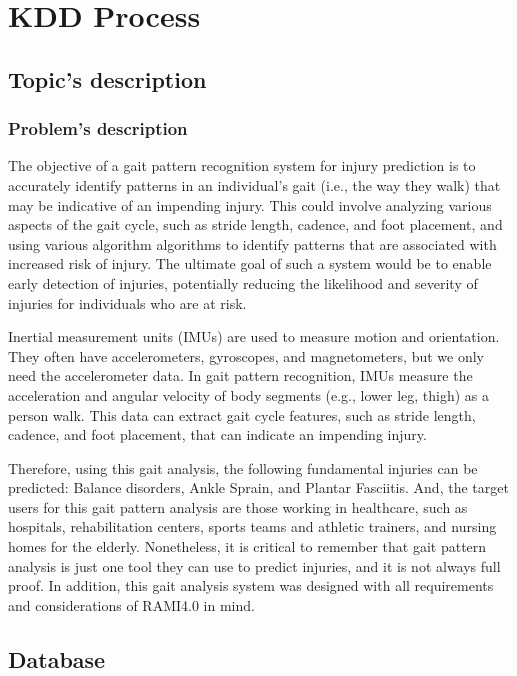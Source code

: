 \chapter{KDD Process}

\section{Topic's description}
\subsection{Problem's description}
The objective of a gait pattern recognition system for injury prediction is to accurately identify patterns in an individual's gait (i.e., the way they walk) that may be indicative of an impending injury. This could involve analyzing various aspects of the gait cycle, such as stride length, cadence, and foot placement, and using various algorithm algorithms to identify patterns that are associated with increased risk of injury. The ultimate goal of such a system would be to enable early detection of injuries, potentially reducing the likelihood and severity of injuries for individuals who are at risk.

\bigskip

Inertial measurement units (IMUs) are used to measure motion and orientation. They often have accelerometers, gyroscopes, and magnetometers, but we only need the accelerometer data. In gait pattern recognition, IMUs measure the acceleration and angular velocity of body segments (e.g., lower leg, thigh) as a person walk. This data can extract gait cycle features, such as stride length, cadence, and foot placement, that can indicate an impending injury.

\bigskip

Therefore, using this gait analysis, the following fundamental injuries can be predicted: Balance disorders, Ankle Sprain, and Plantar Fasciitis. And, the target users for this gait pattern analysis are those working in healthcare, such as hospitals, rehabilitation centers, sports teams and athletic trainers, and nursing homes for the elderly. Nonetheless, it is critical to remember that gait pattern analysis is just one tool they can use to predict injuries, and it is not always full proof. In addition, this gait analysis system was designed with all requirements and considerations of RAMI4.0 in mind.


\section{Database}
